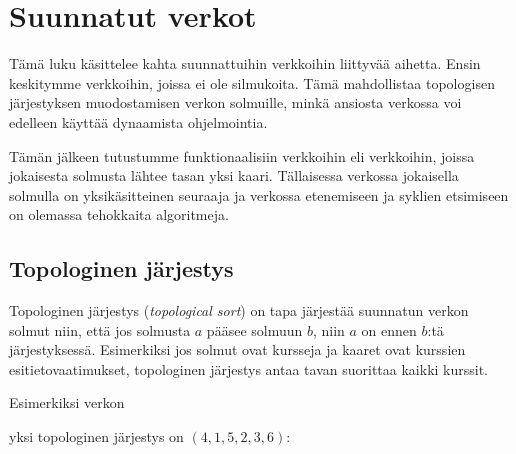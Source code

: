 \chapter{Suunnatut verkot}

Tämä luku käsittelee kahta suunnattuihin
verkkoihin liittyvää aihetta.
Ensin keskitymme verkkoihin, joissa ei ole silmukoita.
Tämä mahdollistaa topologisen järjestyksen
muodostamisen verkon solmuille,
minkä ansiosta verkossa voi edelleen
käyttää dynaamista ohjelmointia.

Tämän jälkeen tutustumme funktionaalisiin
verkkoihin eli verkkoihin, joissa jokaisesta solmusta
lähtee tasan yksi kaari.
Tällaisessa verkossa jokaisella solmulla on
yksikäsitteinen seuraaja ja verkossa etenemiseen
ja syklien etsimiseen on olemassa tehokkaita algoritmeja.

\section{Topologinen järjestys}

Topologinen järjestys
(\textit{topological sort}) on tapa
järjestää suunnatun verkon solmut niin,
että jos solmusta $a$ pääsee solmuun $b$,
niin $a$ on ennen $b$:tä järjestyksessä.
Esimerkiksi jos solmut ovat kursseja
ja kaaret ovat kurssien esitietovaatimukset,
topologinen järjestys antaa
tavan suorittaa kaikki kurssit.

Esimerkiksi verkon
\begin{center}
\end{center}

yksi topologinen järjestys on
$(4, 1, 5, 2, 3, 6)$:
\begin{center}
\end{center}

